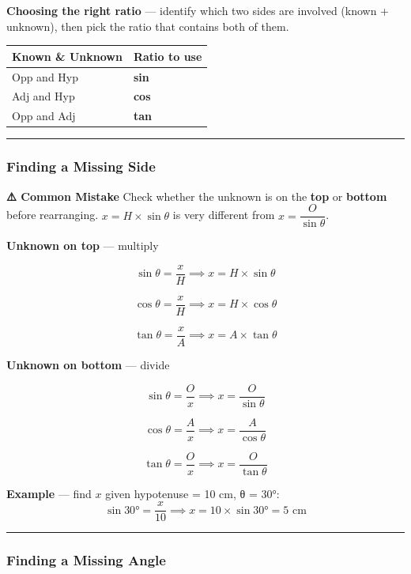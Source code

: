 \documentclass[
  letterpaper,
  DIV=11,
  numbers=noendperiod]{scrreprt}
\theoremstyle{definition}
\theoremstyle{remark}
\begin{document}
\textbf{Choosing the right ratio} --- identify which two sides are
involved (known + unknown), then pick the ratio that contains both of
them.

\begin{longtable}[]{@{}ll@{}}
\toprule\noalign{}
Known \& Unknown & Ratio to use \\
\midrule\noalign{}
\endhead
\bottomrule\noalign{}
\endlastfoot
Opp and Hyp & \textbf{sin} \\
Adj and Hyp & \textbf{cos} \\
Opp and Adj & \textbf{tan} \\
\end{longtable}

\begin{center}\rule{0.5\linewidth}{0.5pt}\end{center}

\subsubsection*{Finding a Missing Side}\label{finding-a-missing-side}

\textbf{⚠️ Common Mistake} Check whether the unknown is on the
\textbf{top} or \textbf{bottom} before rearranging.
\(x = H \times \sin\theta\) is very different from
\(x = \dfrac{O}{\sin\theta}\).

\textbf{Unknown on top} --- multiply

\[\sin\theta = \frac{x}{H} \implies x = H \times \sin\theta\]

\[\cos\theta = \frac{x}{H} \implies x = H \times \cos\theta\]

\[\tan\theta = \frac{x}{A} \implies x = A \times \tan\theta\]

\textbf{Unknown on bottom} --- divide

\[\sin\theta = \frac{O}{x} \implies x = \frac{O}{\sin\theta}\]

\[\cos\theta = \frac{A}{x} \implies x = \frac{A}{\cos\theta}\]

\[\tan\theta = \frac{O}{x} \implies x = \frac{O}{\tan\theta}\]

\textbf{Example} --- find \(x\) given hypotenuse = 10 cm, θ = 30°:
\[\sin 30° = \frac{x}{10} \implies x = 10 \times \sin 30° = 5 \text{ cm}\]

\begin{center}\rule{0.5\linewidth}{0.5pt}\end{center}

\subsubsection*{Finding a Missing Angle}\label{finding-a-missing-angle}
\end{document}
